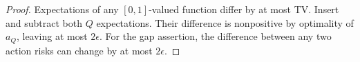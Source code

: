 \begin{proof}
Expectations of any $[0,1]$-valued function differ by at most TV.
Insert and subtract both $Q$ expectations. Their difference is
nonpositive by optimality of $a_Q$, leaving at most $2\epsilon$.
For the gap assertion, the difference between any two action risks
can change by at most $2\epsilon$.
\end{proof}
